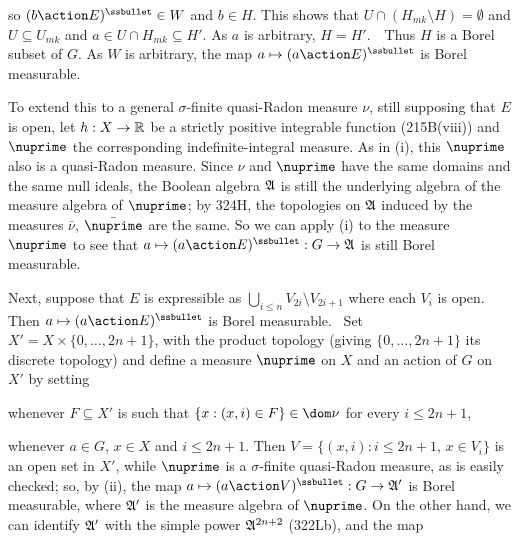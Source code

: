 {\noindent so $(b\action E)^{\ssbullet}\in W$ and $b\in H$.   This shows
that $U\cap(H_{mk}\setminus H)=\emptyset$ and $U\subseteq U_{mk}$ and
$a\in U\cap H_{mk}\subseteq H'$.   As $a$ is arbitrary, $H=H'$.\ \QeD\
Thus $H$ is a
Borel subset of $G$.   As $W$ is arbitrary, the map
$a\mapsto(a\action E)^{\ssbullet}$ is Borel measurable.

\medskip

 To extend this to a general $\sigma$-finite quasi-Radon
measure $\nu$, still
supposing that $E$ is open, let $h:X\to\Bbb R$ be a strictly positive
integrable function (215B(viii)) and $\nuprime$ the corresponding
indefinite-integral measure.   As in (i), this $\nuprime$ also is a
quasi-Radon measure.   Since $\nu$
and $\nuprime$ have the same domains and the same null ideals,
the Boolean algebra $\frak A$ is still the underlying algebra of the
measure algebra of $\nuprime$;  by 324H, the topologies on $\frak A$
induced by the measures $\bar\nu$, $\bar\nuprime$ are the same.   So we
can apply (i) to the measure $\nuprime$ to see that
$a\mapsto(a\action E)^{\ssbullet}:G\to\frak A$ is still Borel
measurable.

\medskip

 Next, suppose that $E$ is expressible as
$\bigcup_{i\le n}V_{2i}\setminus V_{2i+1}$ where each $V_i$ is open.
Then $a\mapsto(a\action E)^{\ssbullet}$ is Borel measurable.   \Prf\ Set
$X'=X\times\{0,\ldots,2n+1\}$, with the product topology (giving
$\{0,\ldots,2n+1\}$ its discrete topology) and define a measure
$\nuprime$ on $X$ and an action of $G$ on $X'$ by setting


\noindent whenever $F\subseteq X'$ is such that
$\{x:(x,i)\in F\}\in\dom\nu$ for every $i\le 2n+1$,


\noindent whenever $a\in G$, $x\in X$ and $i\le 2n+1$.   Then
$V=\{(x,i):i\le 2n+1,\,x\in V_i\}$ is an open set in $X'$, while
$\nuprime$
is a $\sigma$-finite quasi-Radon measure, as is easily checked;  so, by
(ii), the map
$a\mapsto(a\action V)^{\ssbullet}:G\to\frak A'$ is Borel measurable,
where $\frak A'$ is the measure algebra of $\nuprime$.   On the other
hand, we can identify $\frak A'$ with the simple power $\frak A^{2n+2}$
(322Lb), and the map


}
